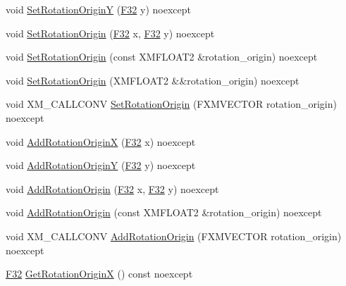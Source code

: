 \begin{DoxyCompactItemize}
\item 
void \hyperlink{classmage_1_1_sprite_transform_a8ccfaf7282419ed636cc97f911472604}{Set\+Rotation\+OriginY} (\hyperlink{namespacemage_aa97e833b45f06d60a0a9c4fc22ae02c0}{F32} y) noexcept
\item 
void \hyperlink{classmage_1_1_sprite_transform_adc5bb1cd5512bea503c981624088a5be}{Set\+Rotation\+Origin} (\hyperlink{namespacemage_aa97e833b45f06d60a0a9c4fc22ae02c0}{F32} x, \hyperlink{namespacemage_aa97e833b45f06d60a0a9c4fc22ae02c0}{F32} y) noexcept
\item 
void \hyperlink{classmage_1_1_sprite_transform_a93070ec524ff5828f8040c103dee41a4}{Set\+Rotation\+Origin} (const X\+M\+F\+L\+O\+A\+T2 \&rotation\+\_\+origin) noexcept
\item 
void \hyperlink{classmage_1_1_sprite_transform_a532771d53e650543d125ffb652671388}{Set\+Rotation\+Origin} (X\+M\+F\+L\+O\+A\+T2 \&\&rotation\+\_\+origin) noexcept
\item 
void X\+M\+\_\+\+C\+A\+L\+L\+C\+O\+NV \hyperlink{classmage_1_1_sprite_transform_acbb3eebc3fd26d616f5e4ca75a8c112b}{Set\+Rotation\+Origin} (F\+X\+M\+V\+E\+C\+T\+OR rotation\+\_\+origin) noexcept
\item 
void \hyperlink{classmage_1_1_sprite_transform_a784e2f78ba65645ad2c40b4d249c744a}{Add\+Rotation\+OriginX} (\hyperlink{namespacemage_aa97e833b45f06d60a0a9c4fc22ae02c0}{F32} x) noexcept
\item 
void \hyperlink{classmage_1_1_sprite_transform_aa6fa39d59d2bd73d1b51ffbe185175a7}{Add\+Rotation\+OriginY} (\hyperlink{namespacemage_aa97e833b45f06d60a0a9c4fc22ae02c0}{F32} y) noexcept
\item 
void \hyperlink{classmage_1_1_sprite_transform_adc0912e49d43143f7fe5c8fc1c25dacf}{Add\+Rotation\+Origin} (\hyperlink{namespacemage_aa97e833b45f06d60a0a9c4fc22ae02c0}{F32} x, \hyperlink{namespacemage_aa97e833b45f06d60a0a9c4fc22ae02c0}{F32} y) noexcept
\item 
void \hyperlink{classmage_1_1_sprite_transform_a540e9757575ce46edcfea9ea5dcac19b}{Add\+Rotation\+Origin} (const X\+M\+F\+L\+O\+A\+T2 \&rotation\+\_\+origin) noexcept
\item 
void X\+M\+\_\+\+C\+A\+L\+L\+C\+O\+NV \hyperlink{classmage_1_1_sprite_transform_a8f1ce16eb9c07a4f798e93bf58eb2b46}{Add\+Rotation\+Origin} (F\+X\+M\+V\+E\+C\+T\+OR rotation\+\_\+origin) noexcept
\item 
\hyperlink{namespacemage_aa97e833b45f06d60a0a9c4fc22ae02c0}{F32} \hyperlink{classmage_1_1_sprite_transform_a980beb77dc4b64a2d784361d61981f9c}{Get\+Rotation\+OriginX} () const noexcept

\end{DoxyCompactItemize}
